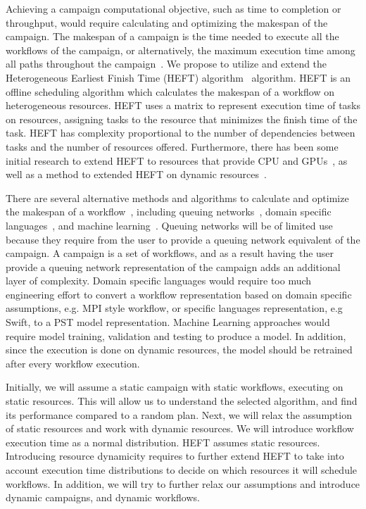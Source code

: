 Achieving a campaign computational objective, such as time to completion or throughput, would require calculating and optimizing the makespan of the campaign.
The makespan of a campaign is the time needed to execute all the workflows of the campaign, or alternatively, the maximum execution time among all paths throughout the campaign~\cite{chirkin2017execution}.
We propose to utilize and extend the Heterogeneous Earliest Finish Time (HEFT) algorithm~\cite{topcuoglu2002performance} algorithm.
HEFT is an offline scheduling algorithm which calculates the makespan of a workflow on heterogeneous resources.
HEFT uses a matrix to represent execution time of tasks on resources, assigning tasks to the resource that minimizes the finish time of the task. 
HEFT has complexity proportional to the number of dependencies between tasks and the number of resources offered.
Furthermore, there has been some initial research to extend HEFT to resources that provide CPU and GPUs~\cite{shetti2013optimization}, as well as a method to extended HEFT on dynamic resources~\cite{dong2007pfas}.

There are several alternative methods and algorithms to calculate and optimize the makespan of a workflow~\cite{lu2019review}, including queuing networks~\cite{yao2019throughput,bao2019performance}, domain specific languages~\cite{carothers2017durango,maheshwari2016workflow}, and machine learning~\cite{witt2019predictive,pumma2017runtime}.
Queuing networks will be of limited use because they require from the user to provide a queuing network equivalent of the campaign.
A campaign is a set of workflows, and as a result having the user provide a queuing network representation of the campaign adds an additional layer of complexity.
Domain specific languages would require too much engineering effort to convert a workflow representation based on domain specific assumptions, e.g. MPI style workflow, or specific languages representation, e.g Swift, to a PST model representation.
Machine Learning approaches would require model training, validation and testing to produce a model.
In addition, since the execution is done on dynamic resources, the model should be retrained after every workflow execution.

Initially, we will assume a static campaign with static workflows, executing on static resources. 
This will allow us to understand the selected algorithm, and find its performance compared to a random plan.
Next, we will relax the assumption of static resources and work with dynamic resources.
We will introduce workflow execution time as a normal distribution.
HEFT assumes static resources.
Introducing resource dynamicity requires to further extend HEFT to take into account execution time distributions to decide on which resources it will schedule workflows.
In addition, we will try to further relax our assumptions and introduce dynamic campaigns, and dynamic workflows.


